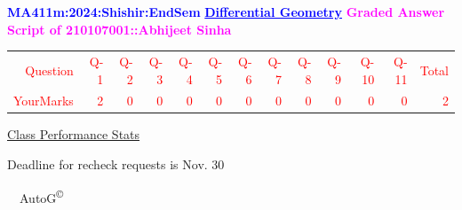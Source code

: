 \documentclass{article}                              %
\begin{document}
%
\vspace*{1in}

\begin{center}
	\textbf{\textcolor{blue}{\LARGE MA411m:2024:Shishir:EndSem}}
	\vskip 1cm
	\textbf{\textcolor{blue}{\underline{\Large Differential Geometry}}}
	\vskip 1cm
	\textbf{\textcolor{magenta}{\LARGE Graded Answer Script of 210107001::Abhijeet Sinha}}
\end{center}


\begin{center}
	\Huge 
	\textcolor{red}{
	\begin{tabular}{*{13}{r}}
		Question&Q-1& Q-2& Q-3& Q-4& Q-5& Q-6& Q-7& Q-8& Q-9& Q-10& Q-11&Total  \\
        	YourMarks&2&0&0&0&0&0&0&0&0&0&0&2
	\end{tabular}
	}
        \vskip 2cm
	\large
	\underline{Class Performance Stats}
	\DTLsetseparator{;}
	\begin{table}[htbp]
		\centering
	\end{table}
	\vskip 1cm
	Deadline for recheck requests is Nov. 30
\end{center}
\ \vfill \ \hfill \small AutoG\textsuperscript{\copyright}
\newpage
%
\end{document}
